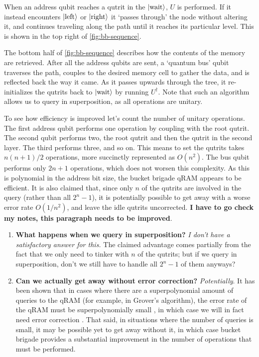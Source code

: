 \documentclass[a4paper,12pt]{article}
\begin{document}
When an address qubit reaches a qutrit in the $\ket{\hbox{wait}}$, $U$ is performed. 
If it instead encounters $\ket{\hbox{left}}$ or $\ket{\hbox{right}}$ it `passes through' the node without altering it, and continues traveling along the path until it reaches its particular level. 
This is shown in the top right of \autoref{fig:bb-sequence}.

The bottom half of \autoref{fig:bb-sequence} describes how the contents of the memory are retrieved. 
After all the address qubits are sent, a `quantum bus' qubit traverses the path, couples to the desired memory cell to gather the data, and is reflected back the way it came. 
As it passes upwards through the tree, it re-initializes the qutrits back to $\ket{\hbox{wait}}$ by running $U^\dag$. 
Note that such an algorithm allows us to query in superposition, as all operations are unitary.

To see how efficiency is improved let's count the number of unitary operations.
The first address qubit performs one operation by coupling with the root qutrit.
The second qubit performs two, the root qutrit and then the qutrit in the second layer. The third performs three, and so on.
This means to set the qutrits takes $n(n+1)/2$ operations, more succinctly represented as $O(n^2)$. 
The bus qubit performs only $2n + 1$ operations, which does not worsen this complexity. 
As this is polynomial in the address bit size, the bucket brigade qRAM appears to be efficient. 
It is also claimed that, since only $n$ of the qutrits are involved in the query (rather than all $2^n-1$), it is potentially possible to get away with a worse error rate $O(1/n^2)$, and leave the idle qutrits uncorrected. 
\textbf{I have to go check my notes, this paragraph needs to be improved}.

\begin{enumerate} 
 \item \textbf{What happens when we query in superposition?} 
  \emph{I don't have a satisfactory answer for this.} 
  The claimed advantage comes partially from the fact that we only need to tinker with $n$ of the qutrits; but if we query in superposition, don't we still have to handle all $2^n - 1$ of them anyways?
 \item \textbf{Can we actually get away without error correction?} \emph{Potentially}. 
 It has been shown that in cases where there are a superpolynomial amount of queries to the qRAM (for example, in Grover's algorithm), the error rate of the qRAM must be superpolynomially small \cite{Regev2008}, in which case we will in fact need error correction \cite{Arunachalam2015}. 
 That said, in situations where the number of queries is small, it may be possible yet to get away without it, in which case bucket brigade provides a substantial improvement in the number of operations that must be performed.
\end{enumerate}
\end{document}
